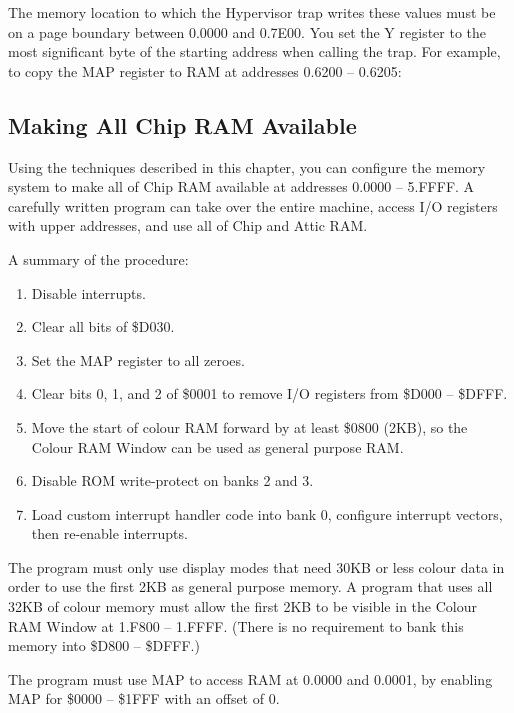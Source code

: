 The memory location to which the Hypervisor trap writes these values must be on a page boundary between 0.0000 and 0.7E00. You set the Y register to the most significant byte of the starting address when calling the trap. For example, to copy the MAP register to RAM at addresses 0.6200 -- 0.6205:


\subsection{Making All Chip RAM Available}

Using the techniques described in this chapter, you can configure the memory system to make all of Chip RAM available at addresses 0.0000 -- 5.FFFF. A carefully written program can take over the entire machine, access I/O registers with upper addresses, and use all of Chip and Attic RAM.

A summary of the procedure:

\begin{enumerate}
\item Disable interrupts.
\item Clear all bits of \$D030.
\item Set the MAP register to all zeroes.
\item Clear bits 0, 1, and 2 of \$0001 to remove I/O registers from \$D000 -- \$DFFF.
\item Move the start of colour RAM forward by at least \$0800 (2KB), so the Colour RAM Window can be used as general purpose RAM.
\item Disable ROM write-protect on banks 2 and 3.
\item Load custom interrupt handler code into bank 0, configure interrupt vectors, then re-enable interrupts.
\end{enumerate}

The program must only use display modes that need 30KB or less colour data in order to use the first 2KB as general purpose memory. A program that uses all 32KB of colour memory must allow the first 2KB to be visible in the Colour RAM Window at 1.F800 -- 1.FFFF. (There is no requirement to bank this memory into \$D800 -- \$DFFF.)

The program must use MAP to access RAM at 0.0000 and 0.0001, by enabling MAP for \$0000 -- \$1FFF with an offset of 0.

